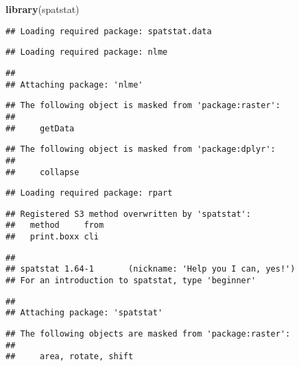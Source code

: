 \documentclass[
  xelatex,ja=standard]{bxjsarticle}
\newenvironment{Shaded}{\begin{snugshade}}{\end{snugshade}}
\newcommand{\KeywordTok}[1]{\textcolor[rgb]{0.13,0.29,0.53}{\textbf{#1}}}
\newcommand{\NormalTok}[1]{#1}
\begin{document}
\begin{Shaded}
\begin{Highlighting}[]
\KeywordTok{library}\NormalTok{(spatstat)}
\end{Highlighting}
\end{Shaded}

\begin{verbatim}
## Loading required package: spatstat.data
\end{verbatim}

\begin{verbatim}
## Loading required package: nlme
\end{verbatim}

\begin{verbatim}
## 
## Attaching package: 'nlme'
\end{verbatim}

\begin{verbatim}
## The following object is masked from 'package:raster':
## 
##     getData
\end{verbatim}

\begin{verbatim}
## The following object is masked from 'package:dplyr':
## 
##     collapse
\end{verbatim}

\begin{verbatim}
## Loading required package: rpart
\end{verbatim}

\begin{verbatim}
## Registered S3 method overwritten by 'spatstat':
##   method     from
##   print.boxx cli
\end{verbatim}

\begin{verbatim}
## 
## spatstat 1.64-1       (nickname: 'Help you I can, yes!') 
## For an introduction to spatstat, type 'beginner'
\end{verbatim}

\begin{verbatim}
## 
## Attaching package: 'spatstat'
\end{verbatim}

\begin{verbatim}
## The following objects are masked from 'package:raster':
## 
##     area, rotate, shift
\end{verbatim}
\end{document}
